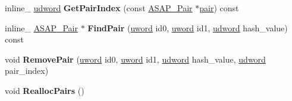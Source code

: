 \begin{DoxyCompactItemize}
\item 
\hypertarget{class_a_s_a_p___pair_manager_a092b5a83a22330bd19934926139fcddb}{inline\+\_\+ \hyperlink{_ice_types_8h_a44c6f1920ba5551225fb534f9d1a1733}{udword} {\bfseries Get\+Pair\+Index} (const \hyperlink{struct_a_s_a_p___pair}{A\+S\+A\+P\+\_\+\+Pair} $\ast$\hyperlink{structpair}{pair}) const }\label{class_a_s_a_p___pair_manager_a092b5a83a22330bd19934926139fcddb}

\item 
\hypertarget{class_a_s_a_p___pair_manager_aab9041461554b91c7748a48f7e3bc509}{inline\+\_\+ \hyperlink{struct_a_s_a_p___pair}{A\+S\+A\+P\+\_\+\+Pair} $\ast$ {\bfseries Find\+Pair} (\hyperlink{_ice_types_8h_a42fa576a6a3b73c1efc32ab91d176300}{uword} id0, \hyperlink{_ice_types_8h_a42fa576a6a3b73c1efc32ab91d176300}{uword} id1, \hyperlink{_ice_types_8h_a44c6f1920ba5551225fb534f9d1a1733}{udword} hash\+\_\+value) const }\label{class_a_s_a_p___pair_manager_aab9041461554b91c7748a48f7e3bc509}

\item 
\hypertarget{class_a_s_a_p___pair_manager_a4b226f19ab2a55f3ff191b811db3cf9f}{void {\bfseries Remove\+Pair} (\hyperlink{_ice_types_8h_a42fa576a6a3b73c1efc32ab91d176300}{uword} id0, \hyperlink{_ice_types_8h_a42fa576a6a3b73c1efc32ab91d176300}{uword} id1, \hyperlink{_ice_types_8h_a44c6f1920ba5551225fb534f9d1a1733}{udword} hash\+\_\+value, \hyperlink{_ice_types_8h_a44c6f1920ba5551225fb534f9d1a1733}{udword} pair\+\_\+index)}\label{class_a_s_a_p___pair_manager_a4b226f19ab2a55f3ff191b811db3cf9f}

\item 
\hypertarget{class_a_s_a_p___pair_manager_ad21f8ffe16f57f0c7a3ed47decd1a67e}{void {\bfseries Realloc\+Pairs} ()}\label{class_a_s_a_p___pair_manager_ad21f8ffe16f57f0c7a3ed47decd1a67e}

\end{DoxyCompactItemize}
